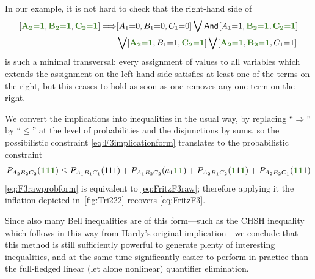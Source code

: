 In our example, it is not hard to check that the right-hand side of
\begin{align}\begin{split}\label{eq:F3implicationform}
	\bracks{\mgreen{A_2 \eql 1}, \mgreen{B_2 \eql 1}, \mgreen{C_2 \eql 1}} \Longrightarrow &\bracks{A_1 \eql 0, B_1 \eql 0, C_1 \eql 0} \bigvee \namedand{A_1 \eql 1, \mgreen{B_2 \eql 1}, \mgreen{C_2 \eql 1}} \\
		& \bigvee \bracks{\mgreen{A_2 \eql 1}, B_1 \eql 1, \mgreen{C_2 \eql 1}} \bigvee \bracks{\mgreen{A_2 \eql 1}, \mgreen{B_2 \eql 1}, C_1 \eql 1}
\end{split}\end{align}
is such a minimal transversal: every assignment of values to all variables which extends the assignment on the left-hand side satisfies at least one of the terms on the right, but this ceases to hold as soon as one removes any one term on the right. 

We convert the implications into inequalities in the usual way, by replacing ``$\Rightarrow$'' by ``$\leq$'' at the level of probabilities and the disjunctions by sums, so the possibilistic constraint \cref{eq:F3implicationform} translates to the probabilistic constraint
\begin{align}\label{eq:F3rawprobform}
    P_{A_2 B_2 C_2}\parens{\mgreen{1} \mgreen{1} \mgreen{1}} \leq P_{A_1 B_1 C_1}\parens{1 1 1}+P_{A_1 B_2 C_2}\parens{a_1 \mgreen{1 1}}+P_{A_2 B_1 C_2}\parens{\mgreen{1} 1 \mgreen{1}}+P_{A_2 B_2 C_1}\parens{\mgreen{1 1} 1}
\end{align}
\cref{eq:F3rawprobform} is equivalent to \cref{eq:FritzF3raw}; therefore applying it the inflation depicted in~\cref{fig:Tri222} recovers \cref{eq:FritzF3}.

Since also many Bell inequalities are of this form---such as the CHSH inequality which follows in this way from Hardy's original implication---we conclude that this method is still sufficiently powerful to generate plenty of interesting inequalities, and at the same time significantly easier to perform in practice than the full-fledged linear (let alone nonlinear) quantifier elimination.




